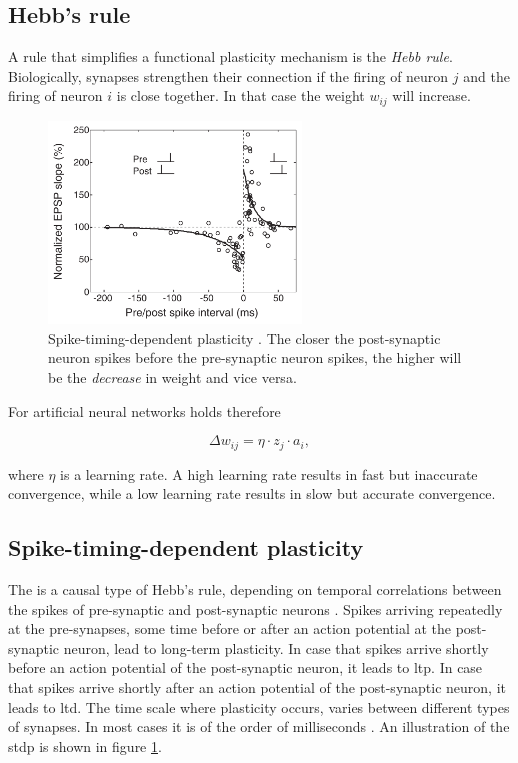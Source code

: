 \subsection{Hebb's rule}

A rule that simplifies a functional plasticity mechanism is the \emph{Hebb rule}. Biologically, synapses strengthen their connection if the firing of neuron $j$ and the firing of neuron $i$ is close together. In that case the weight $w_{ij}$ will increase.

\begin{figure}[!b]
	\centering
	\includegraphics[width=0.6\textwidth]{neurons_plasticity/stdp.png}
	\caption[Spike-timing-dependent plasticity]{Spike-timing-dependent plasticity \parencite[figure 1]{dan2006spike}. The closer the post-synaptic neuron spikes before the pre-synaptic neuron spikes, the higher will be the \emph{decrease} in weight and vice versa.}
	\label{fig:stdp}
\end{figure}

For artificial neural networks holds therefore

\begin{equation}
\Delta w_{ij} = \eta \cdot z_j \cdot a_i,
\end{equation}

where $\eta$ is a learning rate. A high learning rate results in fast but inaccurate convergence, while a low learning rate results in slow but accurate convergence.

\subsection{Spike-timing-dependent plasticity}

The  is a causal type of Hebb's rule, depending on temporal correlations between the spikes of pre-synaptic and post-synaptic neurons \parencite{sjostrom2010spike}. Spikes arriving repeatedly at the pre-synapses, some time before or after an action potential at the post-synaptic neuron, lead to long-term plasticity. In case that spikes arrive shortly before an action potential of the post-synaptic neuron, it leads to \acl{ltp}. In case that spikes arrive shortly after an action potential of the post-synaptic neuron, it leads to \acl{ltd}. The time scale where plasticity occurs, varies between different types of synapses. In most cases it is of the order of milliseconds \parencite{dan2006spike}. An illustration of the \acs{stdp} is shown in figure \ref{fig:stdp}.

